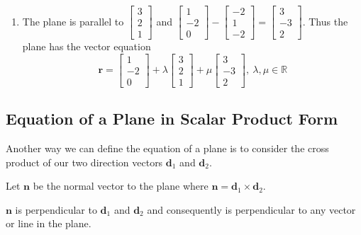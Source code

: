 \documentclass[11pt,a4paper]{book}
\newcommand{\R}{\mathbb{R}}
\begin{document}
\begin{example}
\begin{enumerate}[label=(\alph*)]
\item  The plane is parallel to $\begin{bmatrix}3\\
2\\
1
\end{bmatrix}$ and $\begin{bmatrix}1\\
-2\\
0
\end{bmatrix}-\begin{bmatrix}-2\\
1\\
-2
\end{bmatrix}=\begin{bmatrix}3\\
-3\\
2
\end{bmatrix}$. Thus the plane has the vector equation
\[
\textbf{r}=\begin{bmatrix}1\\
-2\\
0
\end{bmatrix}+\lambda\begin{bmatrix}3\\
2\\
1
\end{bmatrix}+\mu\begin{bmatrix}3\\
-3\\
2
\end{bmatrix},\:\lambda,\mu\in\R
\]

\end{enumerate}

\end{example}

\newpage

\subsection{Equation of a Plane in Scalar Product Form}

Another way we can define the equation of a plane is to consider the
cross product of our two direction vectors $\textbf{d}_{1}$ and $\textbf{d}_{2}$.

Let $\textbf{n}$ be the normal vector to the plane where $\textbf{n}=\textbf{d}_{1}\times\textbf{d}_{2}$.

$\textbf{n}$ is perpendicular to $\textbf{d}_{1}$ and $\textbf{d}_{2}$
and consequently is perpendicular to any vector or line in the plane.
\end{document}
